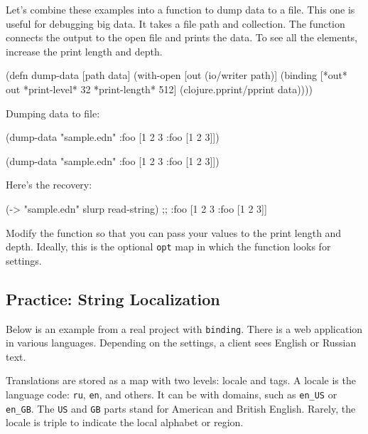 Let's combine these examples into a function to dump data to a file.
This one is useful for debugging big data.
It takes a file path and collection.
The function connects the output to the open file and prints the data.
To see all the elements, increase the print length and depth.

\begin{clojure}
(defn dump-data
  [path data]
  (with-open [out (io/writer path)]
    (binding [*out* out
              *print-level* 32
              *print-length* 512]
      (clojure.pprint/pprint data))))
\end{clojure}

\noindent
Dumping data to file:

\ifx\DEVICETYPE\MOBILE

\begin{clojure}
(dump-data "sample.edn"
  {:foo [1 2 3 {:foo [1 2 3]}]})
\end{clojure}

\else

\begin{clojure}
(dump-data "sample.edn" {:foo [1 2 3 {:foo [1 2 3]}]})
\end{clojure}

\fi

\noindent
Here's the recovery:

\begin{clojure}
(-> "sample.edn" slurp read-string)
;; {:foo [1 2 3 {:foo [1 2 3]}]}
\end{clojure}


Modify the function so that you can pass your values to the print length and depth.
Ideally, this is the optional \verb|opt| map in which the function looks for settings.

\subsection{Practice: String Localization}

\label{translate}

Below is an example from a real project with \verb|binding|. There is a web application in various languages. Depending on the settings, a client sees English or Russian text.


Translations are stored as a map with two levels: locale and tags. A locale is the language code: \verb|ru|, \verb|en|, and others. It can be with domains, such as \verb|en_US| or \verb|en_GB|.
The \verb|US| and \verb|GB| parts stand for American and British English.
Rarely, the locale is triple to indicate the local alphabet or region.

